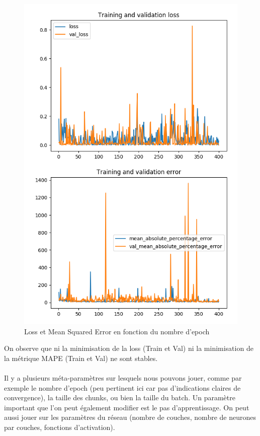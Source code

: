 \documentclass{article}
\begin{document}
    \begin{figure}[H]
        \centering
        \includegraphics[scale=0.5]{ResultsSolar/results.png}
        \caption{Loss et Mean Squared Error en fonction du nombre d'epoch}
        \label{fig:schema}
    \end{figure}
    On observe que ni la minimisation de la loss (Train et Val) ni la minimisation de la métrique MAPE (Train et Val) ne sont stables.\\\\Il y a plusieurs méta-paramètres sur lesquels nous pouvons jouer, comme par exemple le nombre d'epoch (peu pertinent ici car pas d'indications claires de convergence), la taille des chunks, ou bien la taille du batch. Un paramètre important que l'on peut également modifier est le pas d'apprentissage. On peut aussi jouer sur les paramètres du réseau (nombre de couches, nombre de neurones par couches, fonctions d'activation).
    
\end{document}
